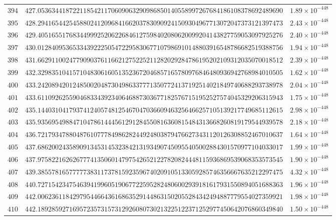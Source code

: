 \documentclass[12pt,reqno]{amsart}
\theoremstyle{remark}
\begin{document}
\begin{longtable}{clc}
$394$ & $427.0536344187221185421170609063290986850140558997267684186108378692489690$ & $1.89\times 10^{-448}$ \\
$395$ & $428.2941654425458802412096841662037830909241509304967713072047373121397473$ & $2.43\times 10^{-448}$ \\
$396$ & $429.4051655176834499925206226846127598402080620099204143827759053097925276$ & $2.40\times 10^{-448}$ \\
$397$ & $430.0128409536533439222505472295830677107986910148803916548786682519388756$ & $1.94\times 10^{-448}$ \\
$398$ & $431.6629110024779090376116621275225211282029284786195202109312035070018512$ & $2.39\times 10^{-448}$ \\
$399$ & $432.3298351041571048306160513523672046857165780976846480936942768984010505$ & $1.62\times 10^{-448}$ \\
$400$ & $433.2420894201248500204873049863377713507724137192514021849740688293738978$ & $2.04\times 10^{-448}$ \\
$401$ & $433.6110926255904683343923406468873036771825767151952527574045329206315943$ & $1.75\times 10^{-448}$ \\
$402$ & $435.1440310417937412405748125467047036609463256466257105139217749685112615$ & $2.98\times 10^{-448}$ \\
$403$ & $435.9356954988471047861444561291284550816360815484313668260819179544939578$ & $2.18\times 10^{-448}$ \\
$404$ & $436.7217934788048761077784986282449248038794766273431120126308852467010637$ & $1.64\times 10^{-448}$ \\
$405$ & $437.6862002435890913453145323842131934907450955405002884301570977104033017$ & $1.99\times 10^{-448}$ \\
$406$ & $437.9758221626267774135060147975426521227820824448115936869539068353573545$ & $1.90\times 10^{-448}$ \\
$407$ & $439.3855781657777738311737815923596740209105133059285746356667635212297475$ & $4.32\times 10^{-448}$ \\
$408$ & $440.7271542347546394199605190677225952824806002939181617931550894051688363$ & $1.96\times 10^{-448}$ \\
$409$ & $442.0062361184297954466436168635291448631502055284342494887779554027359921$ & $1.98\times 10^{-448}$ \\
$410$ & $442.1892859271695723573157312926080730213225122371252977450642076860349840$ & $1.50\times 10^{-448}$ \\

\end{longtable}
\end{document}

